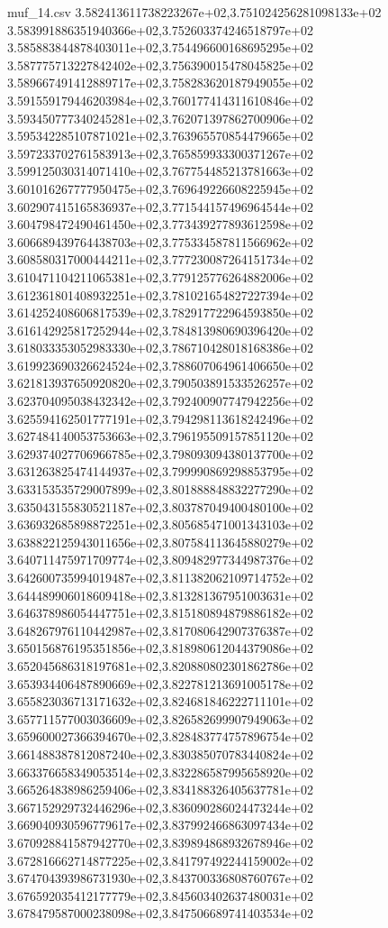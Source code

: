 \begin{filecontents*}{muf_14.csv}
3.582413611738223267e+02,3.751024256281098133e+02
3.583991886351940366e+02,3.752603374246518797e+02
3.585883844878403011e+02,3.754496600168695295e+02
3.587775713227842402e+02,3.756390015478045825e+02
3.589667491412889717e+02,3.758283620187949055e+02
3.591559179446203984e+02,3.760177414311610846e+02
3.593450777340245281e+02,3.762071397862700906e+02
3.595342285107871021e+02,3.763965570854479665e+02
3.597233702761583913e+02,3.765859933300371267e+02
3.599125030314071410e+02,3.767754485213781663e+02
3.601016267777950475e+02,3.769649226608225945e+02
3.602907415165836937e+02,3.771544157496964544e+02
3.604798472490461450e+02,3.773439277893612598e+02
3.606689439764438703e+02,3.775334587811566962e+02
3.608580317000444211e+02,3.777230087264151734e+02
3.610471104211065381e+02,3.779125776264882006e+02
3.612361801408932251e+02,3.781021654827227394e+02
3.614252408606817539e+02,3.782917722964593850e+02
3.616142925817252944e+02,3.784813980690396420e+02
3.618033353052983330e+02,3.786710428018168386e+02
3.619923690326624524e+02,3.788607064961406650e+02
3.621813937650920820e+02,3.790503891533526257e+02
3.623704095038432342e+02,3.792400907747942256e+02
3.625594162501777191e+02,3.794298113618242496e+02
3.627484140053753663e+02,3.796195509157851120e+02
3.629374027706966785e+02,3.798093094380137700e+02
3.631263825474144937e+02,3.799990869298853795e+02
3.633153535729007899e+02,3.801888848832277290e+02
3.635043155830521187e+02,3.803787049400480100e+02
3.636932685898872251e+02,3.805685471001343103e+02
3.638822125943011656e+02,3.807584113645880279e+02
3.640711475971709774e+02,3.809482977344987376e+02
3.642600735994019487e+02,3.811382062109714752e+02
3.644489906018609418e+02,3.813281367951003631e+02
3.646378986054447751e+02,3.815180894879886182e+02
3.648267976110442987e+02,3.817080642907376387e+02
3.650156876195351856e+02,3.818980612044379086e+02
3.652045686318197681e+02,3.820880802301862786e+02
3.653934406487890669e+02,3.822781213691005178e+02
3.655823036713171632e+02,3.824681846222711101e+02
3.657711577003036609e+02,3.826582699907949063e+02
3.659600027366394670e+02,3.828483774757896754e+02
3.661488387812087240e+02,3.830385070783440824e+02
3.663376658349053514e+02,3.832286587995658920e+02
3.665264838986259406e+02,3.834188326405637781e+02
3.667152929732446296e+02,3.836090286024473244e+02
3.669040930596779617e+02,3.837992466863097434e+02
3.670928841587942770e+02,3.839894868932678946e+02
3.672816662714877225e+02,3.841797492244159002e+02
3.674704393986731930e+02,3.843700336808760767e+02
3.676592035412177779e+02,3.845603402637480031e+02
3.678479587000238098e+02,3.847506689741403534e+02

\end{filecontents*}
